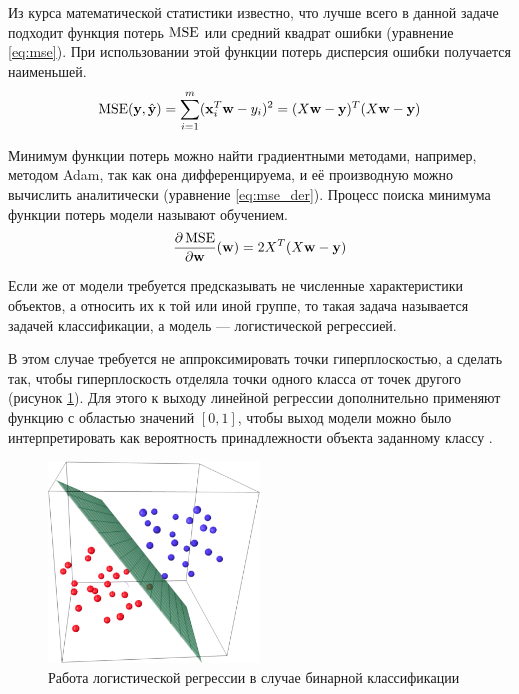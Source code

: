 Из курса математической статистики известно, что лучше всего в данной задаче подходит функция потерь $\operatorname{MSE}$ или средний квадрат ошибки (уравнение \ref*{eq:mse}). При использовании этой функции потерь дисперсия ошибки получается наименьшей.
\begin{equation}
    \label{eq:mse}
    \operatorname{MSE}(\mathbf{y},\hat{\mathbf{y}})=\sum\limits_{i=1}^m(\mathbf{x}_i^T\mathbf{w}-y_i)^2=(X\mathbf{w}-\mathbf{y})^T(X\mathbf{w}-\mathbf{y})
\end{equation}

Минимум функции потерь можно найти градиентными методами, например, методом Adam, так как она дифференцируема, и её производную можно вычислить аналитически (уравнение \ref*{eq:mse_der}). Процесс поиска минимума функции потерь модели называют обучением.
\begin{equation}
    \label{eq:mse_der}
    \frac{\partial\operatorname{MSE}}{\partial \mathbf{w}}(\mathbf{w})=2X^T(X\mathbf{w}-\mathbf{y})
\end{equation}

Если же от модели требуется предсказывать не численные характеристики объектов, а относить их к той или иной группе, то такая задача называется задачей классификации, а модель --- логистической регрессией.

В этом случае требуется не аппроксимировать точки гиперплоскостью, а сделать так, чтобы гиперплоскость отделяла точки одного класса от точек другого (рисунок \ref*{fig:log_reg}). Для этого к выходу линейной регрессии дополнительно применяют функцию с областью значений $[0, 1]$, чтобы выход модели можно было интерпретировать как вероятность принадлежности объекта заданному классу \cite{art:linear_models}.
\begin{figure}
    \centering
    \includegraphics[width=0.5\textwidth]{../inc/images/logistic_regression.png}
    \caption{Работа логистической регрессии в случае бинарной классификации}
    \label{fig:log_reg}
\end{figure}

